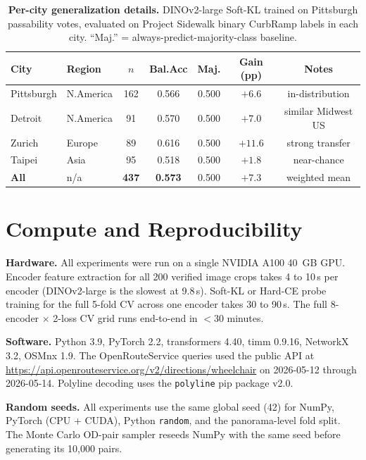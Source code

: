 \documentclass[conference]{IEEEtran}
\begin{document}
\begin{table}[!t]
\caption{\textbf{Per-city generalization details.} DINOv2-large Soft-KL trained on Pittsburgh passability votes, evaluated on Project Sidewalk binary CurbRamp labels in each city. ``Maj.'' = always-predict-majority-class baseline.}
\label{tab:supp_gen}
\centering\scriptsize
\setlength{\tabcolsep}{3.5pt}
\begin{tabular}{@{}llccccc@{}}
\toprule
\textbf{City} & \textbf{Region} & $n$ & \textbf{Bal.Acc} & \textbf{Maj.} & \textbf{Gain (pp)} & \textbf{Notes} \\
\midrule
Pittsburgh & N.America & 162 & 0.566 & 0.500 & $+6.6$ & in-distribution \\
Detroit    & N.America & 91  & 0.570 & 0.500 & $+7.0$ & similar Midwest US \\
Zurich     & Europe    & 89  & 0.616 & 0.500 & $+11.6$ & strong transfer \\
Taipei     & Asia      & 95  & 0.518 & 0.500 & $+1.8$ & near-chance \\
\midrule
\textbf{All} & n/a & \textbf{437} & \textbf{0.573} & 0.500 & $+7.3$ & weighted mean \\
\bottomrule
\end{tabular}
\end{table}

\FloatBarrier
\section{Compute and Reproducibility}
\label{sec:supp_compute}

\textbf{Hardware.} All experiments were run on a single NVIDIA A100 40~GB GPU. Encoder feature extraction for all 200 verified image crops takes 4 to 10\,s per encoder (DINOv2-large is the slowest at 9.8\,s). Soft-KL or Hard-CE probe training for the full 5-fold CV across one encoder takes 30 to 90\,s. The full 8-encoder $\times$ 2-loss CV grid runs end-to-end in $<30$ minutes.

\textbf{Software.} Python 3.9, PyTorch 2.2, transformers 4.40, timm 0.9.16, NetworkX 3.2, OSMnx 1.9. The OpenRouteService queries used the public API at \url{https://api.openrouteservice.org/v2/directions/wheelchair} on 2026-05-12 through 2026-05-14. Polyline decoding uses the \texttt{polyline} pip package v2.0.

\textbf{Random seeds.} All experiments use the same global seed (42) for NumPy, PyTorch (CPU + CUDA), Python \texttt{random}, and the panorama-level fold split. The Monte Carlo OD-pair sampler reseeds NumPy with the same seed before generating its 10{,}000 pairs.
\end{document}
